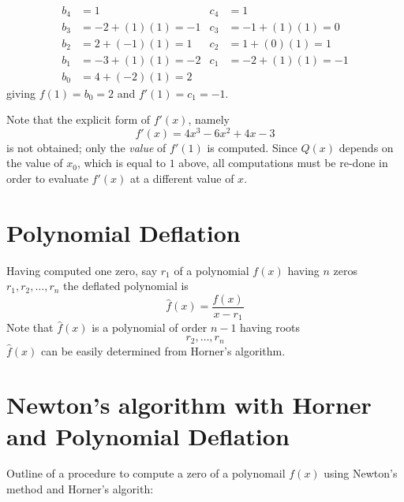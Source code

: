\documentclass [titlepage,12pt,letter] {article}
\begin{document}
\begin{align*} 
b_4 &= 1                  &        c_4 &= 1 \\ 
b_3 &= -2 + (1)(1) = -1   &        c_3 &= -1 + (1)(1) = 0 \\ 
b_2 &= 2 + (-1)(1) = 1    &        c_2 &= 1 + (0)(1) = 1 \\ 
b_1 &= -3 + (1)(1) = -2   &        c_1 &= -2 + (1)(1) = -1 \\ 
b_0 &= 4 + (-2)(1) = 2    &  
\end{align*} 
\noindent 
giving $f(1) = b_0 = 2$ and $f'(1) = c_1 = -1$. 

Note that the explicit form of $f'(x)$, namely 
\[
  f'(x) = 4x^3 - 6 x^ 2 + 4 x - 3 
\]
\noindent 
is not obtained; only the {\it value} of $f'(1)$ is computed. Since $Q(x)$ depends on the value of $x_0$, which is equal to $1$ above, all computations must be re-done in order to evaluate $f'(x)$ at a different value of $x$.  

\section{Polynomial Deflation} 

Having computed one zero, say $r_1$ of a polynomial $f(x)$ having $n$ zeros 
$r_1, r_2, \dots, r_n$ the deflated polynomial is 
\[
\hat f(x) = \frac{f(x)}{x-r_1} 
\]
\noindent 
Note that $\hat f(x)$ is a polynomial of order $n-1$ having roots 
\[ 
r_2, \dots, r_n 
\] 
\noindent 
$\hat f(x)$ can be easily determined from Horner's algorithm. 



\section{Newton's algorithm with Horner and Polynomial Deflation} 

Outline of a procedure to compute a zero of a polynomail $f(x)$ using 
Newton's method and Horner's algorith: 
\end{document}
